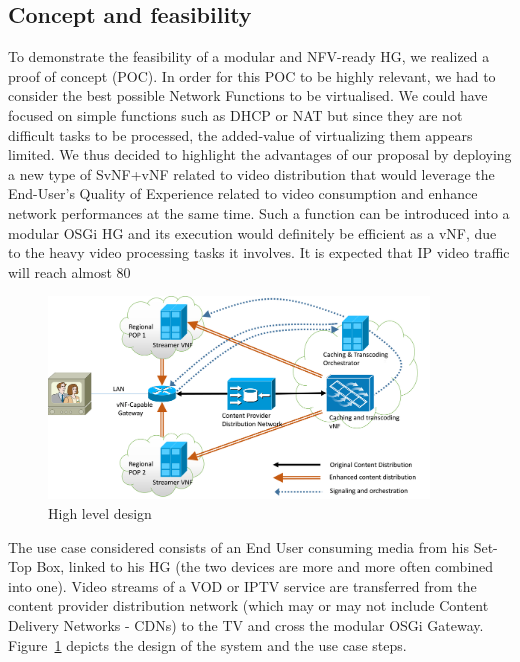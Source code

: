\subsection{Concept and feasibility}
To demonstrate the feasibility of a modular and NFV-ready HG, we realized a proof of concept (POC).
In order for this POC to be highly relevant, we had to consider the best possible Network Functions to be virtualised.
We could have focused on simple functions such as DHCP or NAT but since they are not difficult tasks to be processed, the added-value of virtualizing them appears limited. We thus decided to highlight the advantages of our proposal by deploying a new type of SvNF+vNF related to video distribution that would leverage the End-User's Quality of Experience related to video consumption and enhance network performances at the same time. Such a function can be introduced into a modular OSGi HG and its execution would definitely be efficient as a vNF, due to the heavy video processing tasks it involves. It is expected that IP video traffic will reach almost 80%

\begin{figure}
	
	\center

	\includegraphics[width=0.90\textwidth,natwidth=8132,natheight=4335]{fig/highleveldesign.png}
	\caption{ High level design
    \label{fig:hld}
    }

\end{figure}


The use case considered consists of an End User consuming media from his Set-Top Box, linked to his HG (the two devices are more and more often combined into one).
Video streams of a VOD or IPTV service are transferred from the content provider distribution network (which may or may not include Content Delivery Networks - CDNs) to the TV and cross the modular OSGi Gateway.
Figure~\ref{fig:hld} depicts the design of the system and the use case steps. 
   

